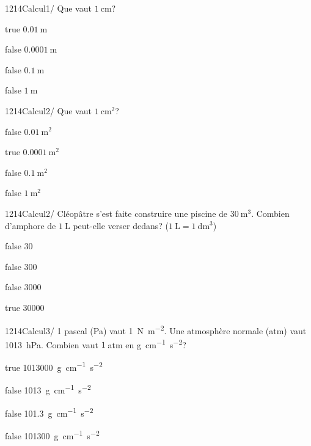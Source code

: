         	\begin{question}{1214}{Calcul}{1}{/}
				Que vaut $\SI{1}{\centi\meter}$?
            \end{question}
            \begin{reponses}
            	\item[true] $\SI{0,01}{\meter}$
            	\item[false] $\SI{0,0001}{\meter}$
                \item[false] $\SI{0,1}{\meter}$
                \item[false] $\SI{1}{\meter}$
            \end{reponses}
        	\begin{question}{1214}{Calcul}{2}{/}
				Que vaut $\SI{1}{\centi\meter^2}$?
            \end{question}
            \begin{reponses}
            	\item[false] $\SI{0,01}{\meter^2}$
            	\item[true] $\SI{0,0001}{\meter^2}$
                \item[false] $\SI{0,1}{\meter^2}$
                \item[false] $\SI{1}{\meter^2}$
            \end{reponses}
        	\begin{question}{1214}{Calcul}{2}{/}
				Cléopâtre s'est faite construire une piscine de $\SI{30}{\meter^3}$. Combien d'amphore de $\SI{1}{\liter}$ peut-elle verser dedans? ($\SI{1}{\liter}=\SI{1}{\deci\meter^3}$)
            \end{question}
            \begin{reponses}
            	\item[false] 30
            	\item[false] 300
                \item[false] 3000
                \item[true] 30000
            \end{reponses}
        	\begin{question}{1214}{Calcul}{3}{/}
				1 pascal (\si{\pascal}) vaut \SI{1}{\newton\per\meter^2}. Une atmosphère normale (atm) vaut \SI{1013}{\hecto\pascal}. Combien vaut $1\;$atm en \si{\gram.\centi\meter^{-1}.\second^{-2}}?
            \end{question}
            \begin{reponses}
            	\item[true] \SI{1013000}{\gram.\centi\meter^{-1}\second^{-2}}
            	\item[false] \SI{1013}{\gram.\centi\meter^{-1}\second^{-2}}
                \item[false] \SI{101,3}{\gram.\centi\meter^{-1}\second^{-2}}
                \item[false] \SI{101300}{\gram.\centi\meter^{-1}\second^{-2}}
            \end{reponses}
